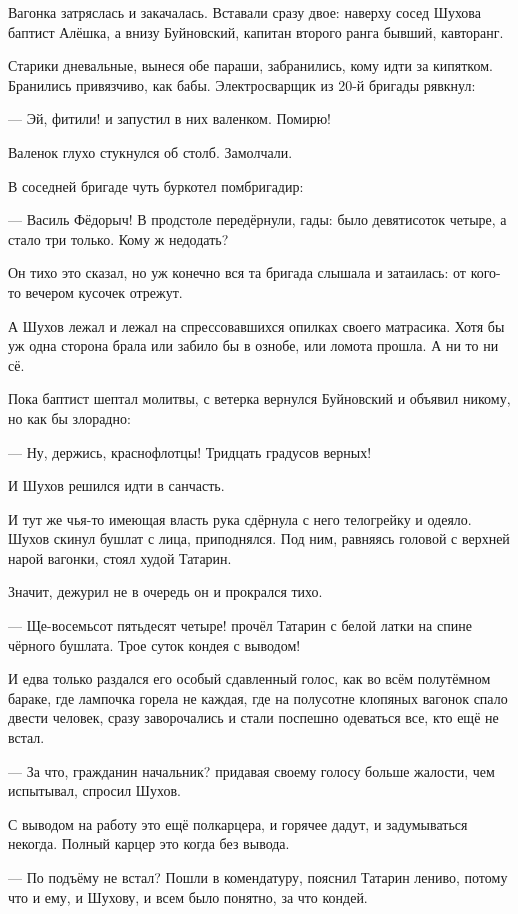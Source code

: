 Вагонка затряслась и закачалась. Вставали сразу двое: наверху \dash сосед Шухова баптист
Алёшка, а внизу \dash Буйновский, капитан второго ранга бывший, кавторанг.

Старики дневальные, вынеся обе параши, забранились, кому идти за кипятком. Бранились
привязчиво, как бабы. Электросварщик из 20-й бригады рявкнул:

--- Эй, фитили! \dash и запустил в них валенком. \Dash Помирю!

Валенок глухо стукнулся об столб. Замолчали.

В соседней бригаде чуть буркотел помбригадир:

--- Василь Фёдорыч! В продстоле передёрнули, гады: было девятисоток четыре, а стало три только.
Кому ж недодать?

Он тихо это сказал, но уж конечно вся та бригада слышала и затаилась: от кого-то вечером
кусочек отрежут.

А Шухов лежал и лежал на спрессовавшихся опилках своего матрасика. Хотя бы уж одна сторона
брала \dash или забило бы в ознобе, или ломота прошла. А ни то ни сё.

Пока баптист шептал молитвы, с ветерка вернулся Буйновский и объявил никому, но как бы
злорадно:

--- Ну, держись, краснофлотцы! Тридцать градусов верных!

И Шухов решился \dash идти в санчасть.

И тут же чья-то имеющая власть рука сдёрнула с него телогрейку и одеяло. Шухов скинул бушлат
с лица, приподнялся. Под ним, равняясь головой с верхней нарой вагонки, стоял худой Татарин.

Значит, дежурил не в очередь он и прокрался тихо.

--- Ще-восемьсот пятьдесят четыре! \dash прочёл Татарин с белой латки на спине чёрного бушлата. \Dash
Трое суток кондея с выводом!

И едва только раздался его особый сдавленный голос, как во всём полутёмном бараке, где
лампочка горела не каждая, где на полусотне клопяных вагонок спало двести человек, сразу
заворочались и стали поспешно одеваться все, кто ещё не встал.

--- За что, гражданин начальник? \dash придавая своему голосу больше жалости, чем испытывал,
спросил Шухов.

С выводом на работу \dash это ещё полкарцера, и горячее дадут, и задумываться некогда. Полный
карцер \dash это когда без вывода.

--- По подъёму не встал? Пошли в комендатуру, \dash пояснил Татарин лениво, потому что и ему, и
Шухову, и всем было понятно, за что кондей.


